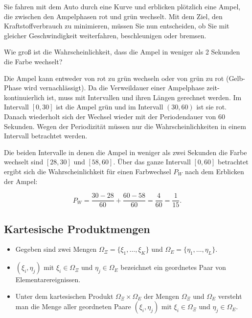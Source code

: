 \begin{beispiel}
Sie fahren mit dem Auto durch eine Kurve und erblicken plötzlich eine Ampel, die zwischen den Ampelphasen rot und grün wechselt. Mit dem Ziel, den Kraftstoffverbrauch zu minimieren, müssen Sie nun entscheiden, ob Sie mit gleicher Geschwindigkeit weiterfahren, beschleunigen oder bremsen.


Wie groß ist die Wahrscheinlichkeit, dass die Ampel in weniger als 2 Sekunden die Farbe wechselt?

Die Ampel kann entweder von rot zu grün wechseln oder von grün zu rot (Gelb-Phase wird vernachlässigt). Da die Verweildauer einer Ampelphase zeit-kontinuierlich ist, muss mit Intervallen und ihren Längen gerechnet werden. Im Intervall $[0, 30]$ ist die Ampel grün und im Intervall $(30, 60)$ ist sie rot. Danach wiederholt sich der Wechsel wieder mit der Periodendauer von 60 Sekunden. Wegen der Periodizität müssen nur die Wahrscheinlichkeiten in einem Intervall betrachtet werden.

Die beiden Intervalle in denen die Ampel in weniger als zwei Sekunden die Farbe wechselt sind $[28, 30]$ und $[58, 60]$. Über das ganze Intervall $[0, 60]$ betrachtet ergibt sich die Wahrscheinlichkeit für einen Farbwechsel $P_W$ nach dem Erblicken der Ampel:

$$
P_W = \frac{30-28}{60} + \frac{60-58}{60} = \frac{4}{60} = \frac{1}{15}.
$$
\end{beispiel}

\subsection{Kartesische Produktmengen}
\label{sec:kartesische-produktmengen}

\begin{definition}
\begin{itemize}
  \item Gegeben sind zwei Mengen $\Omega_\Xi = \{\xi_1, \ldots, \xi_K\}$ und $\Omega_E = \{\eta_1, \ldots, \eta_L\}$.
  \item $(\xi_i, \eta_j)$ mit $\xi_i \in \Omega_\Xi$ und $\eta_j \in \Omega_E$ bezeichnet ein geordnetes Paar von Elementarereignissen.
  \item Unter dem kartesischen Produkt $\Omega_\Xi \times \Omega_E$ der Mengen $\Omega_\Xi$ und $\Omega_E$ versteht man die Menge aller geordneten Paare $(\xi_i, \eta_j)$ mit $\xi_i \in \Omega_\Xi$ und $\eta_j \in \Omega_E$.
\end{itemize}
\end{definition}

